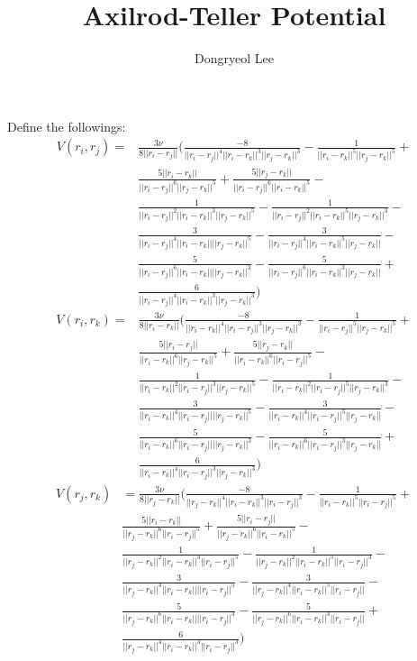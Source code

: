 \documentclass[letterpaper,12pt]{article}
\author{Dongryeol Lee}
\title{Axilrod-Teller Potential}
\begin{document}
\maketitle

Define the followings:
\begin{align*}
V(r_i, r_j) =& \frac{3 \nu}{8 ||r_i - r_j||} \Biggl( \frac{-8}{||r_i -
r_j||^4 ||r_i - r_k||^3 ||r_j - r_k||^3} - \frac{1}{||r_i - r_k||^5
||r_j - r_k||^5} + \\ & \frac{5||r_i - r_k||}{||r_i - r_j||^6 ||r_j -
r_k||^5} + \frac{5||r_j - r_k||}{||r_i - r_j||^6 ||r_i - r_k||^5} -\\
& \frac{1}{||r_i - r_j||^2 ||r_i - r_k||^3 ||r_j - r_k||^5} -
 \frac{1}{||r_i - r_j||^2 ||r_i - r_k||^5 ||r_j - r_k||^3} -\\
& \frac{3}{||r_i - r_j||^4 ||r_i - r_k|| ||r_j - r_k||^5} -
 \frac{3}{||r_i - r_j||^4 ||r_i - r_k||^5 ||r_j - r_k||} -\\
& \frac{5}{||r_i - r_j||^6 ||r_i - r_k|| ||r_j - r_k||^3} -
\frac{5}{||r_i - r_j||^6 ||r_i - r_k||^3 ||r_j - r_k||} +\\
&\frac{6}{||r_i - r_j||^4 ||r_i - r_k||^3 ||r_j - r_k||^3}
 \Biggr )
\end{align*}
\begin{align*}
V(r_i, r_k) =& \frac{3 \nu}{8 ||r_i - r_k||} \Biggl( \frac{-8}{||r_i -
r_k||^4 ||r_i - r_j||^3 ||r_j - r_k||^3} - \frac{1}{||r_i - r_j||^5
||r_j - r_k||^5} + \\ & \frac{5||r_i - r_j||}{||r_i - r_k||^6 ||r_j -
r_k||^5} + \frac{5||r_j - r_k||}{||r_i - r_k||^6 ||r_i - r_j||^5} -\\
& \frac{1}{||r_i - r_k||^2 ||r_i - r_j||^3 ||r_j - r_k||^5} -
 \frac{1}{||r_i - r_k||^2 ||r_i - r_j||^5 ||r_j - r_k||^3} -\\
& \frac{3}{||r_i - r_k||^4 ||r_i - r_j|| ||r_j - r_k||^5} -
 \frac{3}{||r_i - r_k||^4 ||r_i - r_j||^5 ||r_j - r_k||} -\\
& \frac{5}{||r_i - r_k||^6 ||r_i - r_j|| ||r_j - r_k||^3} -
\frac{5}{||r_i - r_k||^6 ||r_i - r_j||^3 ||r_j - r_k||} +\\
&\frac{6}{||r_i - r_k||^4 ||r_i - r_j||^3 ||r_j - r_k||^3}
 \Biggr )
\end{align*}
\begin{align*}
V(r_j, r_k) &= \frac{3 \nu}{8 ||r_j - r_k||} \Biggl( \frac{-8}{||r_j -
r_k||^4 ||r_i - r_k||^3 ||r_i - r_j||^3} - \frac{1}{||r_i - r_k||^5
||r_i - r_j||^5} + \\ & \frac{5||r_i - r_k||}{||r_j - r_k||^6 ||r_i -
r_j||^5} + \frac{5||r_i - r_j||}{||r_j - r_k||^6 ||r_i - r_k||^5} -\\
& \frac{1}{||r_j - r_k||^2 ||r_i - r_k||^3 ||r_i - r_j||^5} -
 \frac{1}{||r_j - r_k||^2 ||r_i - r_k||^5 ||r_i - r_j||^3} -\\
& \frac{3}{||r_j - r_k||^4 ||r_i - r_k|| ||r_i - r_j||^5} -
 \frac{3}{||r_j - r_k||^4 ||r_i - r_k||^5 ||r_i - r_j||} -\\
& \frac{5}{||r_j - r_k||^6 ||r_i - r_k|| ||r_i - r_j||^3} -
\frac{5}{||r_j - r_k||^6 ||r_i - r_k||^3 ||r_i - r_j||} +\\
&\frac{6}{||r_j - r_k||^4 ||r_i - r_k||^3 ||r_i - r_j||^3}
 \Biggr )
\end{align*}
\end{document}
